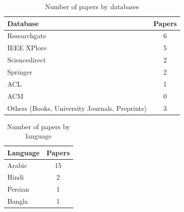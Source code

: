 \documentclass{article}
\begin{document}
\begin{table}[]
    \centering
    \begin{tabular}{p{3in}  c}
    \hline
    \textbf{Database} & \textbf{Papers} \\ \hline
    Researchgate & 6 \\
    IEEE XPlore & 5 \\
    Sciencedirect & 2 \\
    Springer & 2 \\
    ACL & 1 \\ 
    ACM & 0 \\
    Others (Books, University Journals, Preprints) & 3 \\
    \hline
    \end{tabular}
    \caption*{Number of papers by databases}
    \label{papersbydb}
\end{table}
\begin{table}[]
    \centering
    \begin{tabular}{p{2in} c}
    \hline
    \textbf{Language} & \textbf{Papers} \\ \hline
    Arabic & 15 \\
    Hindi & 2 \\
    Persian & 1 \\
    Bangla & 1 \\
    \hline
    \end{tabular}
    \caption*{Number of papers by language}
    
    \label{tab:my_label}
\end{table}

\end{document}
